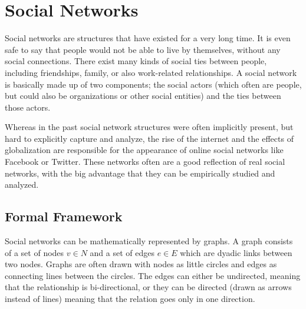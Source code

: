 \section{Social Networks}
\label{s:socialnetworks} Social networks are structures that have existed for a very long time. It is even safe to say that people would not be able to live by themselves, without any social connections. There exist many kinds of social ties between people, including friendships, family, or also work-related relationships. A social network is basically made up of two components; the social actors (which often are people, but could also be organizations or other social entities) and the ties between those actors.

Whereas in the past social network structures were often implicitly present, but hard to explicitly capture and analyze, the rise of the internet and the effects of globalization are responsible for the appearance of online social networks like Facebook or Twitter. These networks often are a good reflection of real social networks, with the big advantage that they can be empirically studied and analyzed.

\subsection{Formal Framework}
\label{sst:formalframeworkgraphs} Social networks can be mathematically represented by graphs. A graph consists of a set of nodes $v \in N$ and a set of edges $e \in E$ which are dyadic links between two nodes. Graphs are often drawn with nodes as little circles and edges as connecting lines between the circles. The edges can either be undirected, meaning that the relationship is bi-directional, or they can be directed (drawn as arrows instead of lines) meaning that the relation goes only in one direction.

